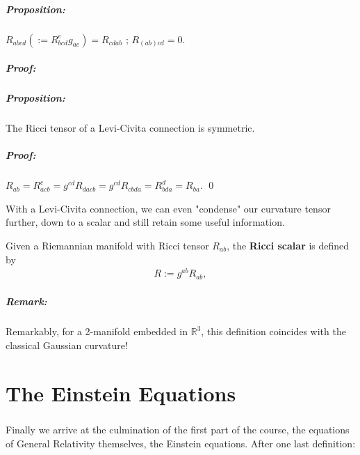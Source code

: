 \documentclass[11pt,fleqn]{report}
\begin{document}
\paragraph{Proposition:} $R_{abcd} \left( := R^e_{bcd} g_{ae} \right) = R_{cdab}$ ; $R_{(ab)cd}=0$.

\paragraph{Proof:} 


\paragraph{Proposition:} The Ricci tensor of a Levi-Civita connection is symmetric.

\paragraph{Proof:} $R_{ab} = R^c_{acb} = g^{cd} R_{dacb} = g^{cd} R_{cbda} = R^d_{bda} = R_{ba}$. \qed

With a Levi-Civita connection, we can even "condense" our curvature tensor further, down to a scalar and still retain some useful information.

\begin{definition}
	Given a Riemannian manifold with Ricci tensor $R_{ab}$, the \textbf{Ricci scalar} is defined by
		\begin{align}
			R := g^{ab} R_{ab},
		\end{align}
\end{definition}

\paragraph{Remark:} Remarkably, for a 2-manifold embedded in $\mathbb{R}^3$, this definition coincides with the classical Gaussian curvature!

\chapter{The Einstein Equations}

\paragraph{} Finally we arrive at the culmination of the first part of the course, the equations of General Relativity themselves, the Einstein equations. After one last definition:
\end{document}
